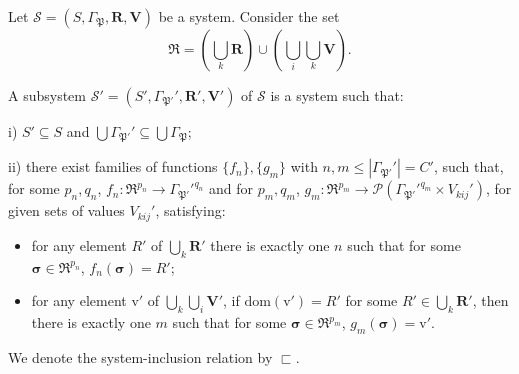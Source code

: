 \begin{definition}[Subsystem] \label{def::subsystem}
	Let $\mathcal{S} = (S, \Gamma_{\mathfrak{P}}, \mathbf{R}, \mathbf{V})$ be a system. Consider the set 
	\[\mathfrak{R} = \left(\bigcup_k \mathbf{R}\right)\cup \left(\bigcup_i \bigcup_k \mathbf{V}\right).\]
	
	A subsystem $\mathcal{S}' = (S',\Gamma_{\mathfrak{P'}}', \mathbf{R'}, \mathbf{V'})$ of $\mathcal{S}$ is a system such that:
	
	\noindent
	i) $S' \subseteq S$ and $ \bigcup\Gamma_{\mathfrak{P'}}' \subseteq \bigcup\Gamma_{\mathfrak{P}}$;
	
	\noindent
	ii) there exist families of functions $\{f_n\}, \{g_m\}$ with $n, m \leq |\Gamma_{\mathfrak{P'}}'| = C'$, such that, for some $p_n, q_n$,  $f_n: \mathfrak{R}^{p_n} \rightarrow \Gamma_{\mathfrak{P'}}'^{q_n}$ and for $p_m, q_m$, $g_m: \mathfrak{R}^{p_m} \rightarrow \mathcal{P}(\Gamma_{\mathfrak{P'}}'^{q_m} \times V_{kij}')$, for given sets of values $V_{kij}'$, satisfying:
	
	\begin{itemize}
	\item[(a)] for any element $R'$ of $\bigcup_k \mathbf{R}'$ there is exactly one $n$ such that for some $\boldsymbol{\sigma} \in \mathfrak{R}^{p_n}$, $f_n(\boldsymbol{\sigma}) = R'$;
	
	\item[(b)] for any element $\mathrm{v}'$ of $\bigcup_k \bigcup_i \mathbf{V}'$, if $\mathrm{dom}(\mathrm{v}') = R'$ for some $R' \in \bigcup_k \mathbf{R}'$, then there is exactly one $m$ such that for some $\boldsymbol{\sigma} \in \mathfrak{R}^{p_m}$, $g_m(\boldsymbol{\sigma}) = \mathrm{v}'$.
	\end{itemize}
	
	\noindent
	We denote the system-inclusion relation by $\sqsubset$.
\end{definition}

